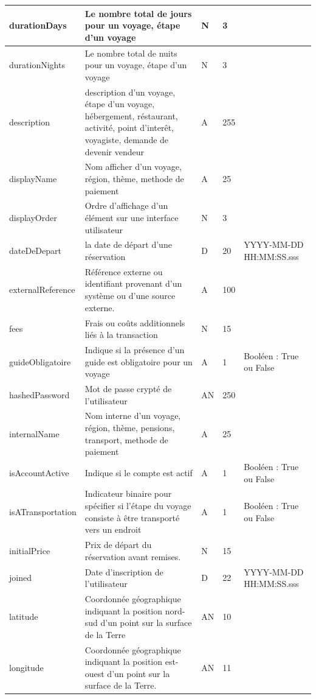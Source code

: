 \documentclass[12pt]{report}
\begin{document}
\begin{longtable}{|p{2cm}|p{4cm}|p{2cm}|p{2cm}|p{4cm}|}
						\hline
						durationDays & Le nombre total de jours pour un voyage, étape d'un voyage & N & 3&\\
						\hline
						durationNights & Le nombre total de nuits pour un voyage, étape d'un voyage & N & 3&\\
						\hline
						description & description d'un voyage, étape d'un voyage, hébergement, réstaurant, activité, point d'interêt, voyagiste, demande de devenir vendeur& A & 255&\\
						\hline
						displayName & Nom afficher d'un voyage, région, thème, methode de paiement & A & 25 & \\
						\hline
						displayOrder & Ordre d'affichage d'un élément sur une interface utilisateur & N & 3 & \\
						\hline
						dateDeDepart & la date de départ d'une réservation & D & 20 & YYYY-MM-DD HH:MM:SS.sss\\
						\hline
						externalReference& Référence externe ou identifiant provenant d'un système ou d'une source externe. & A &100&\\
						\hline
						fees & Frais ou coûts additionnels liés à la transaction & N & 15& \\
						\hline
						guideObligatoire & Indique si la présence d'un guide est obligatoire pour un voyage& A & 1& Booléen : True ou False\\
						\hline
						hashedPassword  & Mot de passe crypté de l'utilisateur & AN & 250 & \\
						\hline
						internalName & Nom interne d'un voyage, région, thème, pensions, transport, methode de paiement & A & 25 & \\
						\hline
						isAccountActive & Indique si le compte est actif & A & 1 & Booléen : True ou False\\
						\hline
						isATransportation& Indicateur binaire pour spécifier si l'étape du voyage consiste à être transporté vers un endroit & A & 1 &Booléen : True ou False\\
						\hline
						initialPrice & Prix de départ du réservation avant remises.&N&15&\\
						\hline
						joined & Date d'inscription de l'utilisateur & D & 22 & YYYY-MM-DD HH:MM:SS.sss\\
						\hline
						latitude & Coordonnée géographique indiquant la position nord-sud d'un point sur la surface de la Terre & AN & 10&\\
						\hline
						longitude & Coordonnée géographique indiquant la position est-ouest d'un point sur la surface de la Terre. & AN & 11& \\

\end{longtable}
\end{document}
